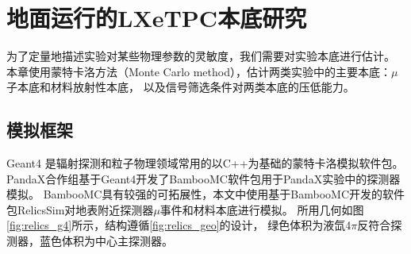
\chapter{地面运行的LXeTPC本底研究}
\label{sec:backgrounds}

为了定量地描述实验对某些物理参数的灵敏度，我们需要对实验本底进行估计。
本章使用蒙特卡洛方法（Monte Carlo method），估计两类实验中的主要本底：$\mu$子本底和材料放射性本底，
以及信号筛选条件对两类本底的压低能力。

\section{模拟框架}

Geant4 是辐射探测和粒子物理领域常用的以C++为基础的蒙特卡洛模拟软件包\cite{agostinelli_geant4simulation_2003,allison_geant4_2006,allison_recent_2016}。
PandaX合作组基于Geant4开发了BambooMC软件包用于PandaX实验中的探测器模拟\cite{chen_bamboomc_2021}。
BambooMC具有较强的可拓展性，本文中使用基于BambooMC开发的软件包RelicsSim对地表附近探测器$\mu$事件和材料本底进行模拟。
所用几何如图\ref{fig:relics_g4}所示，结构遵循\ref{fig:relics_geo}的设计，
绿色体积为液氙4$\pi$反符合探测器，蓝色体积为中心主探测器。

